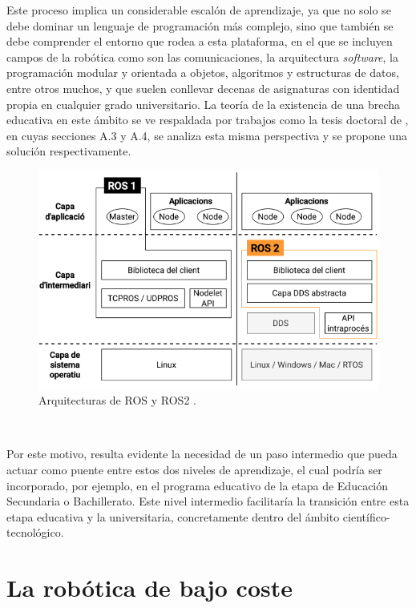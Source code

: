 Este proceso implica un considerable escalón de aprendizaje, ya que no solo se
debe dominar un lenguaje de programación más complejo, sino que también se debe
comprender el entorno que rodea a esta plataforma, en el que se incluyen campos
de la robótica como son las comunicaciones, la arquitectura \textit{software},
la programación modular y orientada a objetos, algoritmos y estructuras de
datos, entre otros muchos, y que suelen conllevar decenas de asignaturas con
identidad propia en cualquier grado universitario.
La teoría de la existencia de una brecha educativa en este ámbito se ve
respaldada por trabajos como la tesis doctoral de \cite{vega2018}, en cuyas
secciones A.3 y A.4, se analiza esta misma perspectiva y se propone una solución
respectivamente.

\begin{figure} [h!]
  \begin{center}
    \includegraphics[width=12cm]{figs/ROS_and_ROS2}
  \end{center}
  \caption{Arquitecturas de ROS y ROS2 \cite{ros_ros2}.}
  \label{fig:ros}
\end{figure}\

Por este motivo, resulta evidente la necesidad de un paso intermedio que pueda
actuar como puente entre estos dos niveles de aprendizaje, el cual podría ser
incorporado, por ejemplo, en el programa educativo de la etapa de Educación
Secundaria o Bachillerato.
Este nivel intermedio facilitaría la transición entre esta etapa educativa y la
universitaria, concretamente dentro del ámbito científico-tecnológico.



\section{La robótica de bajo coste}
\label{sec:robotica_bajo_coste} %

